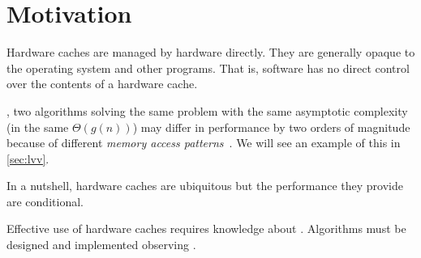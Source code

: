 \section{Motivation} %

Hardware caches are managed by hardware directly.  They are generally opaque to the
operating system and other programs.  That is, software has no direct control over the
contents of a hardware cache.

, two algorithms solving the same
problem with the same asymptotic complexity (in the same \(\Theta(g(n))\)) may differ in
performance by two orders of magnitude because of different \emph{memory access
patterns}~\cite{bigos}.  We will see an example of this in
\cref{sec:lvv}.

In a nutshell, hardware caches are ubiquitous but the performance  they provide are conditional.
\begin{comment}
   To use them effectively,
   algorithms must be designed and implemented with the architecture
   of hardware caches in mind.
\end{comment}
Effective use of hardware caches requires knowledge about .  Algorithms must be designed and implemented observing .


